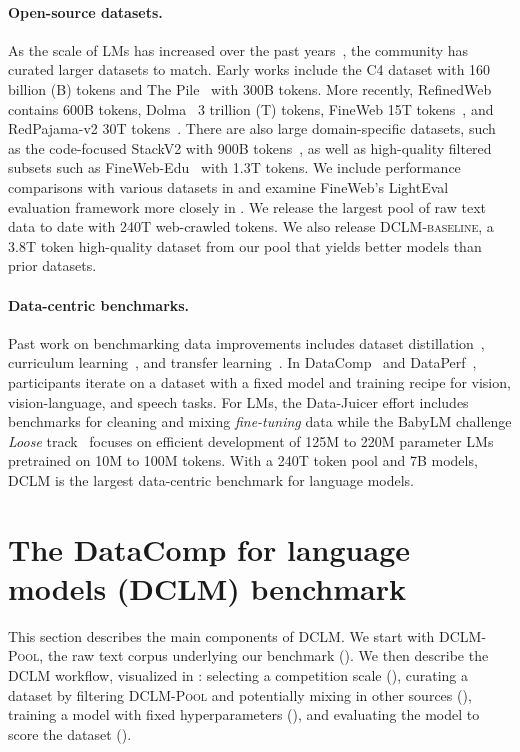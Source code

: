 \documentclass{article}
\newcommand{\smallsec}[1]{\paragraph{#1}}
\newcommand{\dclm}{\textsc{DCLM}\xspace}
\newcommand{\rawpool}{\textsc{DCLM-Pool}\xspace}
\newcommand{\hqpool}{\textsc{DCLM-baseline}\xspace}
\newcommand{\numpooltokens}{240T\xspace}
\begin{document}
\smallsec{Open-source datasets.} As the scale of LMs has increased over the past years~\citep{llama,llama2,llama3,Chowdhery2022PaLMSL,chinchilla,gpt4,gopher,gemmateam2024gemma}, the community has curated larger datasets to match.
Early works include the C4 dataset with 160 billion (B) tokens and The Pile~\citep{pile} with 300B tokens.
More recently, RefinedWeb~\citep{refinedweb} contains 600B tokens, Dolma~\citep{soldaini2024dolma} 3 trillion (T) tokens, FineWeb 15T tokens~\citep{penedo2024fineweb}, and RedPajama-v2 30T tokens~\citep{rpjv2}.
There are also large domain-specific datasets, such as the code-focused StackV2 with 900B tokens~\citep{lozhkov2024starcoder}, as well as high-quality filtered subsets such as FineWeb-Edu~\citep{lozhkov2024fineweb-edu} with 1.3T tokens.
We include performance comparisons with various datasets in  and examine FineWeb's LightEval evaluation framework more closely in .
We release the largest pool of raw text data to date with \numpooltokens web-crawled tokens.
We also release \hqpool, a 3.8T token high-quality dataset from our pool that yields better models than prior datasets.

\smallsec{Data-centric benchmarks.} Past work on benchmarking data improvements includes dataset distillation~\citep{cui2022dcbench}, curriculum learning~\citep{pmlr-v139-romac21a}, and transfer learning~\citep{albalak-etal-2022-feta,pmlr-v162-bugliarello22a}. In DataComp~\citep{gadre2024datacomp} and DataPerf~\citep{dataperf}, participants iterate on a dataset with a fixed model and training recipe for vision, vision-language, and speech tasks. For LMs, the Data-Juicer \citep{datajuicer2023} effort includes benchmarks for cleaning and mixing \textit{fine-tuning} data while the BabyLM challenge \emph{Loose} track~\citep{warstadt-etal-2023-findings} focuses on efficient development of 125M to 220M parameter LMs pretrained on 10M to 100M tokens.
With a 240T token pool and 7B models, \dclm is the largest data-centric benchmark for language models.


\section{The DataComp for language models (\dclm) benchmark}\label{sec:benchmark}




This section describes the main components of \dclm.
We start with \rawpool, the raw text corpus underlying our benchmark  ().
We then describe the \dclm workflow, visualized in : selecting a competition scale (), curating a dataset by filtering \rawpool and potentially mixing in other sources (), training a model with fixed hyperparameters (), and evaluating the model to score the dataset ().
\end{document}

